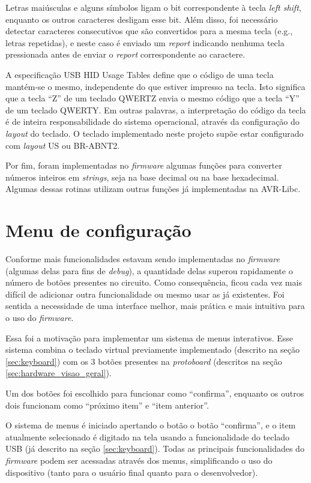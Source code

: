 \documentclass[brazil,pagestart=firstchapter]{abnt}
\makeatletter
\newcommand*{\eg}{e.g.\@\xspace}
\makeatother
\begin{document}
Letras maiúsculas e alguns símbolos ligam o bit correspondente à tecla
\textit{left shift}, enquanto os outros caracteres desligam esse bit. Além
disso, foi necessário detectar caracteres consecutivos que são convertidos
para a mesma tecla (\eg, letras repetidas), e neste caso é enviado um
\textit{report} indicando nenhuma tecla pressionada antes de enviar o
\textit{report} correspondente ao caractere.

A especificação \ac{USB} \ac{HID} Usage Tables define que o código de uma
tecla mantém-se o mesmo, independente do que estiver impresso na tecla. Isto
significa que a tecla ``Z'' de um teclado QWERTZ envia o mesmo código que a
tecla ``Y'' de um teclado QWERTY. \cite[p.~53]{usbhut} Em outras palavras, a
interpretação do código da tecla é de inteira responsabilidade do sistema
operacional, através da configuração do \textit{layout} do teclado.  O
teclado implementado neste projeto supõe estar configurado com
\textit{layout} US ou BR-ABNT2.

Por fim, foram implementadas no \textit{firmware} algumas funções para
converter números inteiros em \textit{strings}, seja na base decimal ou na
base hexadecimal. Algumas dessas rotinas utilizam outras funções já
implementadas na AVR-Libc.


\section{Menu de configuração}
\label{sec:menu}

Conforme mais funcionalidades estavam sendo implementadas no
\textit{firmware} (algumas delas para fins de \textit{debug}), a quantidade
delas superou rapidamente o número de botões presentes no circuito. Como
consequência, ficou cada vez mais difícil de adicionar outra funcionalidade
ou mesmo usar as já existentes. Foi sentida a necessidade de uma interface
melhor, mais prática e mais intuitiva para o uso do \textit{firmware}.

Essa foi a motivação para implementar um sistema de menus interativos. Esse
sistema combina o teclado virtual previamente implementado (descrito na
seção \ref{sec:keyboard}) com os 3 botões presentes na \textit{protoboard}
(descritos na seção \ref{sec:hardware_visao_geral}).

Um dos botões foi escolhido para funcionar como ``confirma'', enquanto os
outros dois funcionam como ``próximo item'' e ``item anterior''.

O sistema de menus é iniciado apertando o botão o botão ``confirma'', e o
item atualmente selecionado é digitado na tela usando a funcionalidade do
teclado \ac{USB} (já descrito na seção \ref{sec:keyboard}). Todas as
principais funcionalidades do \textit{firmware} podem ser acessadas através
dos menus, simplificando o uso do dispositivo (tanto para o usuário final
quanto para o desenvolvedor).
\end{document}
